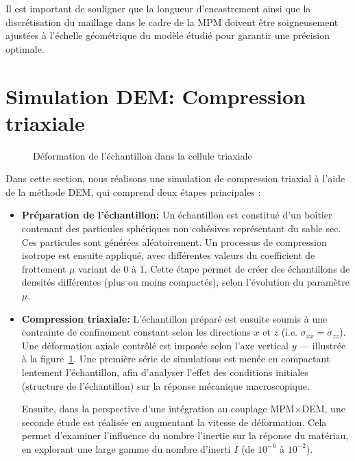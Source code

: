 \documentclass[a4paper,12pt]{report}
\begin{document}
Il est important de souligner que la longueur d'encastrement ainsi que la discrétisation du maillage dans le cadre de la MPM doivent être soigneusement ajustées à l’échelle géométrique du modèle étudié pour garantir une précision optimale.





\section{Simulation DEM: Compression triaxiale}

\begin{figure}[h]
    \centering
    \caption{Déformation de l’échantillon dans la cellule triaxiale}
    \label{fig:boiteDeformation}
\end{figure}

Dans cette section, nous réalisons une simulation de compression triaxial à l’aide de la méthode DEM, qui comprend deux étapes principales :

\begin{itemize}
    \item \textbf{Préparation de l’échantillon:}  
    Un échantillon est constitué d’un boîtier contenant des particules sphériques non cohésives représentant du sable sec. Ces particules sont générées aléatoirement. Un processus de compression isotrope est ensuite appliqué, avec différentes valeurs du coefficient de frottement  $\mu$ variant de 0 à 1.  
    Cette étape permet de créer des échantillons de densités différentes (plus ou moins compactés), selon l’évolution du paramètre $\mu$.

    \item \textbf{Compression triaxiale:}  
    L’échantillon préparé est ensuite soumis à une contrainte de confinement constant  selon les directions $x$ et $z$ (i.e. $\sigma_{xx} = \sigma_{zz}$). Une déformation axiale contrôlé  est imposée selon l’axe vertical $y$ — illustrée à la figure~\ref{fig:boiteDeformation}.  
    Une première série de simulations est menée en compactant lentement l’échantillon, afin d’analyser l’effet des conditions initiales (structure de l’échantillon) sur la réponse mécanique macroscopique.

    Ensuite, dans la perspective d’une intégration au couplage MPM$\times$DEM, une seconde étude est réalisée en augmentant la vitesse de déformation. Cela permet d’examiner l’influence du nombre l'inertie sur la réponse du matériau, en explorant une large gamme du nombre d’inerti  $I$ (de $10^{-6}$ à $10^{-2}$).
\end{itemize}
\end{document}
